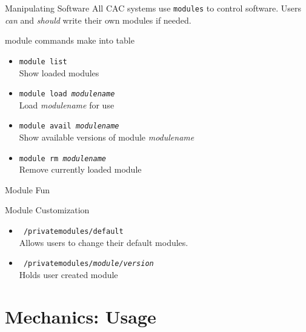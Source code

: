 \documentclass{beamer}
\begin{document}
\begin{frame}{Manipulating Software}
  All CAC systems use \texttt{modules} to control software. Users \textit{can} and \textit{should} write their own modules if needed.
  \begin{block}{module commands}
    \alert{make into table}
  \begin{itemize}
    \item \texttt{module list} \\ Show loaded modules
    \item \texttt{module load \textit{modulename}} \\  Load \textit{modulename} for use
    \item \texttt{module avail \textit{modulename}} \\ Show available versions of module \textit{modulename}
    \item \texttt{module rm \textit{modulename}} \\  Remove currently loaded module
  \end{itemize}
  \end{block}
\end{frame}
\begin{frame}{Module Fun}
  \begin{block}{Module Customization}
  \begin{itemize}
  \item \texttt{~/privatemodules/default}
   \\    Allows users to change their default modules.
  \item \texttt{~/privatemodules/\textit{module/version}}
   \\    Holds user created module
  \end{itemize}
  \end{block}
\end{frame}
 
  \section{Mechanics: Usage}
\end{document}
